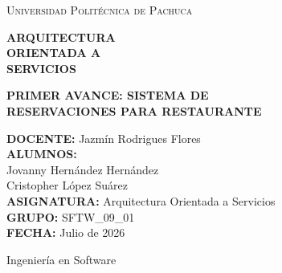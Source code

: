 \documentclass[12pt,a4paper]{article}
\begin{document}

\begin{titlepage}


\vspace*{1.5cm}

\begin{center}
  {\small\scshape Universidad Politécnica de Pachuca}
\end{center}

\vspace{2.5cm}

\begin{center}
  {\LARGE\bfseries ARQUITECTURA\\[4pt]
  ORIENTADA A\\[4pt]
  SERVICIOS}
\end{center}

\vspace{1cm}

\begin{center}
  {\large\bfseries PRIMER AVANCE: SISTEMA DE\\[4pt]
  RESERVACIONES PARA RESTAURANTE}
\end{center}

\vspace{2.2cm}

\noindent\textbf{DOCENTE:} Jazmín Rodrigues Flores\\[6pt]
\noindent\textbf{ALUMNOS:}\\[4pt]
\hspace*{1em} Jovanny Hernández Hernández\\[2pt]
\hspace*{1em} Cristopher López Suárez\\[6pt]
\noindent\textbf{ASIGNATURA:} Arquitectura Orientada a Servicios\\[6pt]
\noindent\textbf{GRUPO:} SFTW\_09\_01\\[6pt]
\noindent\textbf{FECHA:} Julio de 2026

\vfill

\begin{center}
  {\small Ingeniería en Software}
\end{center}

\restoregeometry
\end{titlepage}
\end{document}
